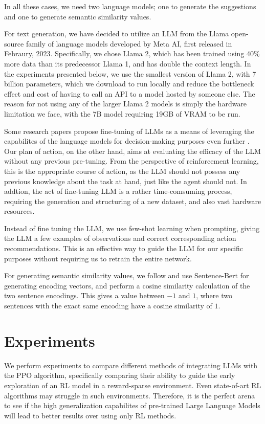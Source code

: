 \documentclass[conference]{IEEEtran}
\begin{document}
In all these cases, we need two language models; one to generate the suggestions and one to generate semantic similarity values.

For text generation, we have decided to utilize an LLM from the Llama open-source family of language models developed by Meta AI, first released in Febraury, 2023. Specifically, we chose Llama 2, which has been trained using 40\% more data than its predecessor Llama 1, and has double the context length\cite{llama}. In the experiments presented below, we use the smallest version of Llama 2, with 7 billion parameters, which we download to run locally and reduce the bottleneck effect and cost of having to call an API to a model hosted by someone else. The reason for not using any of the larger Llama 2 models is simply the hardware limitation we face, with the 7B model requiring 19GB of VRAM to be run. 

Some research papers propose fine-tuning of LLMs as a means of leveraging the capabilites of the language models for decision-making purposes even further \cite{grounding}. Our plan of action, on the other hand, aims at evaluating the efficacy of the LLM without any previous pre-tuning. From the perspective of reinforcement learning, this is the appropriate course of action, as the LLM should not possess any previous knowledge about the task at hand, just like the agent should not. In addtion, the act of fine-tuning LLM is a rather time-comsuming process, requiring the generation and structuring of a new dataset, and also vast hardware resources. 

Instead of fine tuning the LLM, we use few-shot learning when prompting, giving the LLM a few examples of observations and correct corresponding action recommendations. This is an effective way to guide the LLM for our specific purposes without requiring us to retrain the entire network.

For generating semantic similarity values, we follow \cite{ellm} and use Sentence-Bert \cite{bert} for generating encoding vectors, and perform a cosine similarity calculation of the two sentence encodings. This gives a value between $-1$ and $1$, where two sentences with the exact same encoding have a cosine similarity of $1$.


\section{Experiments}

We perform experiments to compare different methods of integrating LLMs with the PPO algorithm, specifically comparing their ability to guide the early exploration of an RL model in a reward-sparse environment. Even state-of-art RL algorithms may struggle in such environments. Therefore, it is the perfect arena to see if the high generalization capabilites of pre-trained Large Language Models will lead to better results over using only RL methods.
\end{document}
